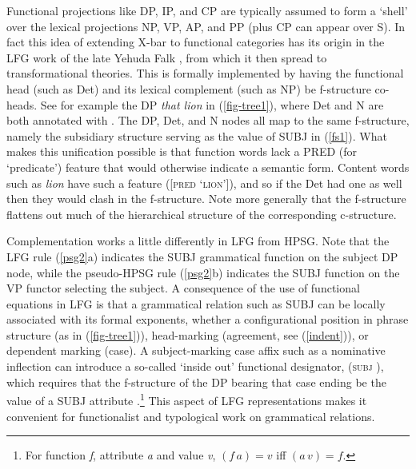Functional projections like DP, IP, and CP are typically assumed to form a `shell' over the lexical projections NP, VP, AP, and PP (plus CP can appear over S).  In fact this idea of extending X-bar to functional categories has its origin in the LFG work of the late Yehuda Falk \citep{Falk84a-u}, from which it then spread to  transformational theories.   This is formally implemented by having the functional head (such as Det) and its lexical complement (such as NP) be f-structure co-heads.  See for example the DP \textit{that lion} in (\ref{fig-tree1}), where Det and N are both annotated with \updown .  The DP, Det, and N nodes all map to the same f-structure, namely the subsidiary structure serving as the value of SUBJ in (\ref{fs1}).  What makes this unification possible is that function words lack a PRED (for `predicate') feature that would otherwise indicate a semantic form.  Content words such as \textit{lion} have such a feature ([\textsc{pred} `\textsc{lion}']), and so if the Det had one as well then they would clash in the f-structure.  Note more generally that the f-structure flattens out much of the hierarchical structure of the corresponding c-structure.  



Complementation works a little differently in LFG from HPSG.  Note that the LFG  rule (\ref{psg2}a) indicates the SUBJ grammatical function on the subject DP node, while the pseudo-HPSG rule (\ref{psg2}b) indicates the SUBJ function on the VP functor selecting the subject.   A consequence of the use of functional equations in LFG is that a grammatical relation such as SUBJ can be locally associated with its formal exponents, whether a configurational position in phrase structure (as in (\ref{fig-tree1})), head-marking (agreement, see (\ref{indent})), or dependent marking (case).  A subject-marking case affix such as a nominative inflection can introduce a so-called `inside out' functional designator, (\textsc{subj} \up), which requires that the f-structure of the DP bearing that case ending be the value of a SUBJ attribute \citep{Nordlinger98a-u}.\footnote{For function \textit{f}, attribute \textit{a} and value \textit{v}, $(f \, a) = v$ iff $(a \, v) = f$.}  This aspect of LFG representations makes it convenient for functionalist and typological work on grammatical relations.  


 

